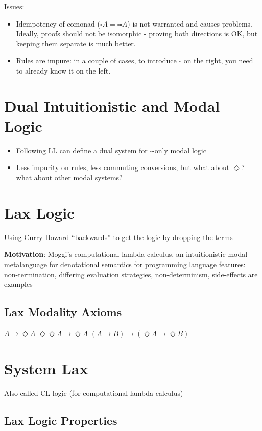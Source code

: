 \documentclass[11pt]{article}
\begin{document}
Issues:
\begin{itemize}
    \item Idempotency of comonad ($\square A = \square \square A$) is not warranted and causes problems. Ideally, proofs should not be isomorphic - proving both directions is OK, but keeping them separate is much better.
    \item Rules are impure: in a couple of cases, to introduce $\square$ on the right, you need to already know it on the left.
\end{itemize}

\section{Dual Intuitionistic and Modal Logic}
\begin{itemize}
    \item Following LL can define a dual system for $\square$-only modal logic
    \item Less impurity on rules, less commuting conversions, but what about $\Diamond$? what about other modal systems?
\end{itemize}

\section{Lax Logic}

Using Curry-Howard ``backwards'' to get the logic by dropping the terms

\textbf{Motivation}: Moggi's computational lambda calculus, an intuitionistic modal metalanguage for denotational semantics for programming language features: non-termination, differing evaluation strategies, non-determinism, side-effects are examples

\subsection{Lax Modality Axioms}

$A \rightarrow \Diamond A$
$\Diamond\Diamond A \rightarrow \Diamond A$
$(A \rightarrow B) \rightarrow (\Diamond A \rightarrow \Diamond B)$

\section{System Lax}

Also called CL-logic (for computational lambda calculus)

\subsection{Lax Logic Properties}
\end{document}
